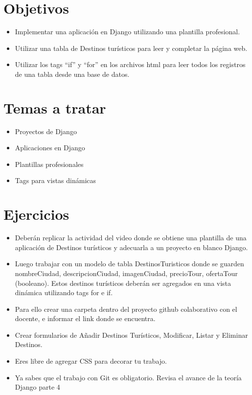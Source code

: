 \documentclass{article}
\begin{document}
\section{Objetivos}
        \begin{itemize}
            \item Implementar una aplicación en Django utilizando una plantilla profesional.
            \item Utilizar una tabla de Destinos turísticos para leer y completar la página web.
            \item Utilizar los tags “if” y “for” en los archivos html para leer todos los registros de una tabla desde una base de datos.
        \end{itemize}

\section{Temas a tratar}
        \begin{itemize}
            \item Proyectos de Django
            \item Aplicaciones en Django
            \item Plantillas profesionales
            \item Tags para vistas dinámicas
        \end{itemize}
    
\section{Ejercicios}
\begin{itemize}
    \item Deberán replicar la actividad del video donde se obtiene una plantilla de una aplicación de Destinos turísticos y adecuarla a un proyecto en blanco Django.
    \item Luego trabajar con un modelo de tabla DestinosTuristicos donde se guarden nombreCiudad, descripcionCiudad, imagenCiudad, precioTour, ofertaTour (booleano). Estos destinos turísticos deberán ser agregados en una vista dinámica utilizando tags for e if.
    \item Para ello crear una carpeta dentro del proyecto github colaborativo con el docente, e informar el link donde se encuentra.
    \item Crear formularios de Añadir Destinos Turísticos, Modificar, Listar y Eliminar Destinos.
    \item Eres libre de agregar CSS para decorar tu trabajo.
    \item Ya sabes que el trabajo con Git es obligatorio. Revisa el avance de la teoría Django parte 4
\end{itemize} 
\end{document}
